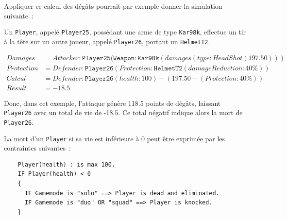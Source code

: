 Appliquer ce calcul des dégâts pourrait par exemple donner la simulation suivante~: 
{\footnotesize
\begin{framed}
Un \texttt{Player}, appelé \texttt{Player25}, possédant une arme de type \texttt{Kar98k}, effectue un tir à la tête sur un autre joueur, appelé \texttt{Player26}, portant un \texttt{HelmetT2}.


\begin{equation*}
\begin{split}
Damages& = Attacker:\texttt{Player25}(\texttt{Weapon}:\texttt{Kar98k}(damages(type:HeadShot(197.50)))\\
Protection& = Defender:\texttt{Player26}(Protection:\texttt{HelmetT2}(damageReduction:40\%))\\
Calcul& = Defender:\texttt{Player26}(health:100) - (197.50 - (Protection:40\%))\\
Result& = -18.5
\end{split}
\end{equation*}


Donc, dans cet exemple, l'attaque génère 118.5 points de dégâts, laissant \texttt{Player26} avec un total de vie de -18.5. Ce total négatif indique alors la mort de \texttt{Player26}.
\end{framed}
}

\goodbreak
\begin{samepage}
La mort d'un \texttt{Player} si sa vie est inférieure à 0 peut être exprimée par les contraintes suivantes~:
{
\footnotesize
\begin{framed}
\begin{verbatim}
    Player(health) : is max 100.
    IF Player(health) < 0
    {
      IF Gamemode is "solo" ==> Player is dead and eliminated.
      IF Gamemode is "duo" OR "squad" ==> Player is knocked.
    }
\end{verbatim}
\end{framed}
}
\end{samepage}






